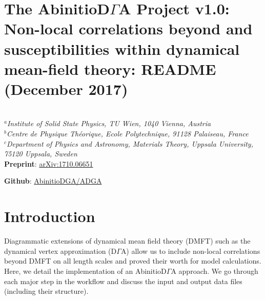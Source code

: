 \documentclass[a4paper,11pt]{article}
\numberwithin{equation}{section} %
\begin{document}
\section*{The AbinitioD$\Gamma$A Project v1.0: Non-local correlations beyond and susceptibilities within dynamical mean-field theory: README (December 2017)}
\begin{framed}
\\
\center\textit{{$^a$Institute of Solid State Physics, TU Wien, 1040 Vienna, Austria\\
$^b$Centre de Physique Théorique, Ecole Polytechnique, 91128 Palaiseau, France\\
$^c$Department of Physics and Astronomy, Materials Theory, Uppsala University, 75120 Uppsala, Sweden}}
\\[1\baselineskip]
\textbf{Preprint}: \href{https://arxiv.org/abs/1710.06651}{arXiv:1710.06651}

\textbf{Github}: \href{https://github.com/AbinitioDGA/ADGA}{AbinitioDGA/ADGA}
\end{framed}

\section{Introduction}
Diagrammatic extensions of dynamical mean field theory (DMFT) such as the dynamical vertex approximation (D$\Gamma$A) allow us to include non-local correlations beyond DMFT on all length scales and proved their worth for model calculations. Here, we detail the implementation of an AbinitioD$\Gamma$A approach. We go through each major step in the workflow and discuss the input and output data files (including their structure).

\end{document}
